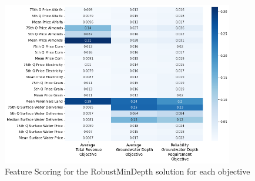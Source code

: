 \documentclass[11pt,a4paper]{article}
\begin{document}
\begin{figure}[H]
    \centering
    \includegraphics[width=0.9\textwidth]{./figs/prim_robust_mindepth_rank_objectives.png}
    \caption{Feature Scoring for the RobustMinDepth solution for each objective}
    \label{fig:m1esh1}
\end{figure}

\newpage
\printbibliography
\end{document}
